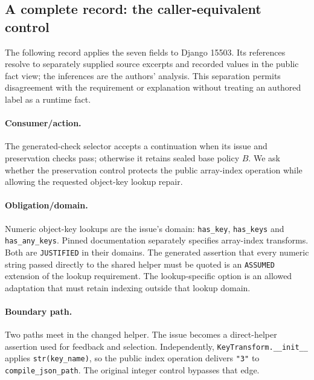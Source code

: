 \subsection{A complete record: the caller-equivalent control}
\label{sec:analysis-spec}
The following record applies the seven fields to Django 15503. Its references
resolve to separately supplied source excerpts and recorded values in the
public fact view; the inferences are the authors' analysis. This separation
permits disagreement with the requirement or explanation without treating
an authored label as a runtime fact.

\paragraph{Consumer/action.}
The generated-check selector accepts a continuation when its issue and
preservation checks pass; otherwise it retains sealed base policy $B$.
We ask whether the preservation control protects the public array-index
operation while allowing the requested object-key lookup repair.

\paragraph{Obligation/domain.}
Numeric object-key lookups are the issue's domain:
\texttt{has\_key}, \texttt{has\_keys} and \texttt{has\_any\_keys}.
Pinned documentation separately
specifies array-index transforms. Both are \texttt{JUSTIFIED} in their domains.
The generated assertion that every numeric string passed directly to the
shared helper must be quoted is an \texttt{ASSUMED} extension of the lookup
requirement. The lookup-specific option is an allowed adaptation that must
retain indexing outside that lookup domain.

\paragraph{Boundary path.}
Two paths meet in the changed helper. The issue becomes a direct-helper
assertion used for feedback and selection. Independently,
\texttt{KeyTransform.\allowbreak{}\_\_init\_\_} applies \texttt{str(key\_name)},
so the public index operation delivers \texttt{"3"} to
\texttt{compile\_json\_path}. The original integer control bypasses that edge.


